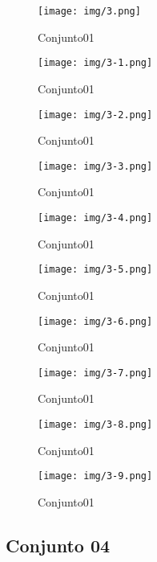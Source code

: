 \begin{figure}[ht!]
	\centering
	\texttt{[image: img/3.png]}
	\caption{Conjunto01}
	\label{3}
\end{figure}

\begin{figure}[ht!]
	\centering
	\texttt{[image: img/3-1.png]}
	\caption{Conjunto01}
	\label{3-1}
\end{figure}

\begin{figure}[ht!]
	\centering
	\texttt{[image: img/3-2.png]}
	\caption{Conjunto01}
	\label{3-2}
\end{figure}

\begin{figure}[ht!]
	\centering
	\texttt{[image: img/3-3.png]}
	\caption{Conjunto01}
	\label{3-3}
\end{figure}

\begin{figure}[ht!]
	\centering
	\texttt{[image: img/3-4.png]}
	\caption{Conjunto01}
	\label{3-4}
\end{figure}

\begin{figure}[ht!]
	\centering
	\texttt{[image: img/3-5.png]}
	\caption{Conjunto01}
	\label{3-5}
\end{figure}

\begin{figure}[ht!]
	\centering
	\texttt{[image: img/3-6.png]}
	\caption{Conjunto01}
	\label{3-6}
\end{figure}

\begin{figure}[ht!]
	\centering
	\texttt{[image: img/3-7.png]}
	\caption{Conjunto01}
	\label{3-7}
\end{figure}

\begin{figure}[ht!]
	\centering
	\texttt{[image: img/3-8.png]}
	\caption{Conjunto01}
	\label{3-8}
\end{figure}

\begin{figure}[ht!]
	\centering
	\texttt{[image: img/3-9.png]}
	\caption{Conjunto01}
	\label{3-9}
\end{figure}



\newpage
\subsection{Conjunto 04}\label{subs:c04}

